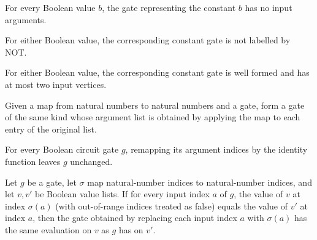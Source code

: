 \begin{theorem}
\label{BoolCircuit.constGate_args}
\leanok
{}
For every Boolean value $b$, the gate representing the constant $b$ has no input
arguments.
\end{theorem}

\begin{theorem}
\label{BoolCircuit.constGate_kind_ne_not}
\leanok
{}
For either Boolean value, the corresponding constant gate is not labelled by NOT.
\end{theorem}

\begin{theorem}
\label{BoolCircuit.constGate_faninTwo}
\leanok
{}
For either Boolean value, the corresponding constant gate is well formed and has at most
two input vertices.
\end{theorem}

\begin{definition}
\label{BoolCircuit.DAGGate.remap}
\leanok
{}
Given a map from natural numbers to natural numbers and a gate, form a gate of the same
kind whose argument list is obtained by applying the map to each entry of the original
list.
\end{definition}

\begin{theorem}
\label{BoolCircuit.DAGGate.remap_id}
\leanok
{}
For every Boolean circuit gate $g$, remapping its argument indices by the identity
function leaves $g$ unchanged.
\end{theorem}

\begin{theorem}
\label{BoolCircuit.DAGGate.eval_remap}
\leanok
{}
Let $g$ be a gate, let $\sigma$ map natural-number indices to natural-number indices,
and let $v,v'$ be Boolean value lists. If for every input index $a$ of $g$, the value of
$v$ at index $\sigma(a)$ (with out-of-range indices treated as false) equals the value
of $v'$ at index $a$, then the gate obtained by replacing each input index $a$ with
$\sigma(a)$ has the same evaluation on $v$ as $g$ has on $v'$.
\end{theorem}

